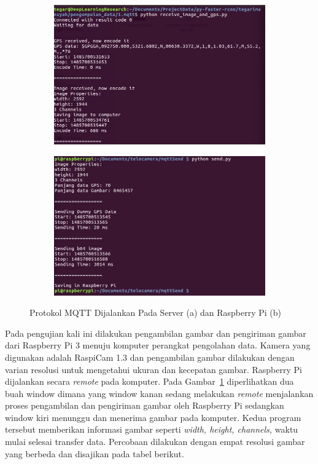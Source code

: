 \begin{figure}[ht]
  \centering
  \begin{subfigure}[b]{0.495\textwidth}
    \includegraphics[width=\textwidth]{mqtt_server}
    \caption{}
  \end{subfigure}             
  \begin{subfigure}[b]{0.495\textwidth}
    \includegraphics[width=\textwidth]{mqtt_raspi}
    \caption{}
  \end{subfigure}
 \caption{Protokol MQTT Dijalankan Pada Server (a) dan Raspberry Pi (b)}
 \label{fig:mqtt_result}   
\end{figure}

Pada pengujian kali ini dilakukan pengambilan gambar dan pengiriman gambar dari Raspberry Pi 3 menuju komputer perangkat pengolahan data. Kamera yang digunakan adalah RaspiCam 1.3 dan pengambilan gambar dilakukan dengan varian resolusi untuk mengetahui ukuran dan kecepatan gambar. Raspberry Pi dijalankan secara \textit{remote} pada komputer. Pada Gambar~\ref{fig:mqtt_result} diperlihatkan dua buah window dimana yang window kanan sedang melakukan \textit{remote} menjalankan proses pengambilan dan pengiriman gambar oleh Raspberry Pi sedangkan window kiri menunggu dan menerima gambar pada komputer. Kedua program tersebut memberikan informasi gambar seperti \textit{width, height, channels, } waktu mulai selesai transfer data. Percobaan dilakukan dengan empat resolusi gambar yang berbeda dan disajikan pada tabel berikut.

